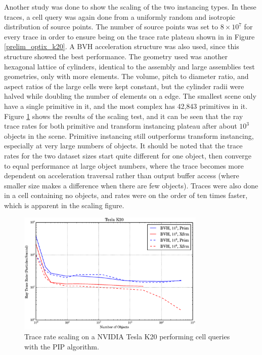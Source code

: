 Another study was done to show the scaling of the two instancing types.  In these traces, a cell query was again done from a uniformly random and isotropic distribution of source points.  The number of source points was set to $8\times10^7$ for every trace in order to ensure being on the trace rate plateau shown in in Figure \ref{prelim_optix_k20}.  A BVH acceleration structure was also used, since this structure showed the best performance.  The geometry used was another hexagonal lattice of cylinders, identical to the assembly and large assemblies test geometries, only with more elements.  The volume, pitch to diameter ratio, and aspect ratios of the large cells were kept constant, but the cylinder radii were halved while doubling the number of elements on a edge.  The smallest scene only have a single primitive in it, and the most complex has 42,843 primitives in it.  Figure \ref{prelim_optix_scaling} shows the results of the scaling test, and it can be seen that the ray trace rates for both primitive and transform instancing plateau after about $10^3$ objects in the scene.  Primitive instancing still outperforms transform instancing, especially at very large numbers of objects.  It should be noted that the trace rates for the two dataset sizes start quite different for one object, then converge to equal performance at large object numbers, where the trace becomes more dependent on acceleration traversal rather than output buffer access (where smaller size makes a difference when there are few objects).  Traces were also done in a cell containing no objects, and rates were on the order of ten times faster, which is apparent in the scaling figure.

\begin{figure}[h!] 
  \centering
    \includegraphics[width=0.8\textwidth]{graphics/prelim_optix_scaling.eps}
     \caption{Trace rate scaling on a NVIDIA Tesla K20 performing cell queries with the PIP algorithm. \label{prelim_optix_scaling} }
\end{figure}

